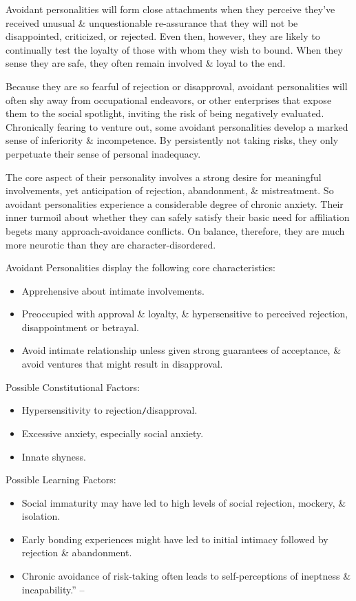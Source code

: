 \documentclass{article}
\numberwithin{equation}{section}
\begin{document}
Avoidant personalities will form close attachments when they perceive they've received unusual \& unquestionable re-assurance that they will not be disappointed, criticized, or rejected. Even then, however, they are likely to continually test the loyalty of those with whom they wish to bound. When they sense they are safe, they often remain involved \& loyal to the end.

Because they are so fearful of rejection or disapproval, avoidant personalities will often shy away from occupational endeavors, or other enterprises that expose them to the social spotlight, inviting the risk of being negatively evaluated. Chronically fearing to venture out, some avoidant personalities develop a marked sense of inferiority \& incompetence. By persistently not taking risks, they only perpetuate their sense of personal inadequacy.

The core aspect of their personality involves a strong desire for meaningful involvements, yet anticipation of rejection, abandonment, \& mistreatment. So avoidant personalities experience a considerable degree of chronic anxiety. Their inner turmoil about whether they can safely satisfy their basic need for affiliation begets many approach-avoidance conflicts. On balance, therefore, they are much more neurotic than they are character-disordered.

Avoidant Personalities display the following core characteristics:
\begin{itemize}
	\item Apprehensive about intimate involvements.
	\item Preoccupied with approval \& loyalty, \& hypersensitive to perceived rejection, disappointment or betrayal.
	\item Avoid intimate relationship unless given strong guarantees of acceptance, \& avoid ventures that might result in disapproval.
\end{itemize}
Possible Constitutional Factors:
\begin{itemize}
	\item Hypersensitivity to rejection\texttt{/}disapproval.
	\item Excessive anxiety, especially social anxiety.
	\item Innate shyness.
\end{itemize}
Possible Learning Factors:
\begin{itemize}
	\item Social immaturity may have led to high levels of social rejection, mockery, \& isolation.
	\item Early bonding experiences might have led to initial intimacy followed by rejection \& abandonment.
	\item Chronic avoidance of risk-taking often leads to self-perceptions of ineptness \& incapability.'' -- \cite[pp. 62--64]{Simon2011}
\end{itemize}
\end{document}
